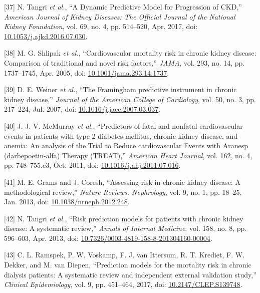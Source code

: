\documentclass[12pt,PhD,twoside,openright]{muthesis}
\newenvironment{cslreferences}%
  {}%
  {\par}
\begin{document}
\begin{cslreferences}
\leavevmode\hypertarget{ref-tangri_dynamic_2017}{}%
{[}37{]} N. Tangri \emph{et al.}, ``A Dynamic Predictive Model for Progression of CKD,'' \emph{American Journal of Kidney Diseases: The Official Journal of the National Kidney Foundation}, vol. 69, no. 4, pp. 514--520, Apr. 2017, doi: \href{https://doi.org/10.1053/j.ajkd.2016.07.030}{10.1053/j.ajkd.2016.07.030}.

\leavevmode\hypertarget{ref-shlipak_cardiovascular_2005}{}%
{[}38{]} M. G. Shlipak \emph{et al.}, ``Cardiovascular mortality risk in chronic kidney disease: Comparison of traditional and novel risk factors,'' \emph{JAMA}, vol. 293, no. 14, pp. 1737--1745, Apr. 2005, doi: \href{https://doi.org/10.1001/jama.293.14.1737}{10.1001/jama.293.14.1737}.

\leavevmode\hypertarget{ref-weiner_framingham_2007}{}%
{[}39{]} D. E. Weiner \emph{et al.}, ``The Framingham predictive instrument in chronic kidney disease,'' \emph{Journal of the American College of Cardiology}, vol. 50, no. 3, pp. 217--224, Jul. 2007, doi: \href{https://doi.org/10.1016/j.jacc.2007.03.037}{10.1016/j.jacc.2007.03.037}.

\leavevmode\hypertarget{ref-mcmurray_predictors_2011}{}%
{[}40{]} J. J. V. McMurray \emph{et al.}, ``Predictors of fatal and nonfatal cardiovascular events in patients with type 2 diabetes mellitus, chronic kidney disease, and anemia: An analysis of the Trial to Reduce cardiovascular Events with Aranesp (darbepoetin-alfa) Therapy (TREAT),'' \emph{American Heart Journal}, vol. 162, no. 4, pp. 748--755.e3, Oct. 2011, doi: \href{https://doi.org/10.1016/j.ahj.2011.07.016}{10.1016/j.ahj.2011.07.016}.

\leavevmode\hypertarget{ref-grams_assessing_2013}{}%
{[}41{]} M. E. Grams and J. Coresh, ``Assessing risk in chronic kidney disease: A methodological review,'' \emph{Nature Reviews. Nephrology}, vol. 9, no. 1, pp. 18--25, Jan. 2013, doi: \href{https://doi.org/10.1038/nrneph.2012.248}{10.1038/nrneph.2012.248}.

\leavevmode\hypertarget{ref-tangri_risk_2013}{}%
{[}42{]} N. Tangri \emph{et al.}, ``Risk prediction models for patients with chronic kidney disease: A systematic review,'' \emph{Annals of Internal Medicine}, vol. 158, no. 8, pp. 596--603, Apr. 2013, doi: \href{https://doi.org/10.7326/0003-4819-158-8-201304160-00004}{10.7326/0003-4819-158-8-201304160-00004}.

\leavevmode\hypertarget{ref-ramspek_prediction_2017}{}%
{[}43{]} C. L. Ramspek, P. W. Voskamp, F. J. van Ittersum, R. T. Krediet, F. W. Dekker, and M. van Diepen, ``Prediction models for the mortality risk in chronic dialysis patients: A systematic review and independent external validation study,'' \emph{Clinical Epidemiology}, vol. 9, pp. 451--464, 2017, doi: \href{https://doi.org/10.2147/CLEP.S139748}{10.2147/CLEP.S139748}.


\end{cslreferences}
\end{document}
